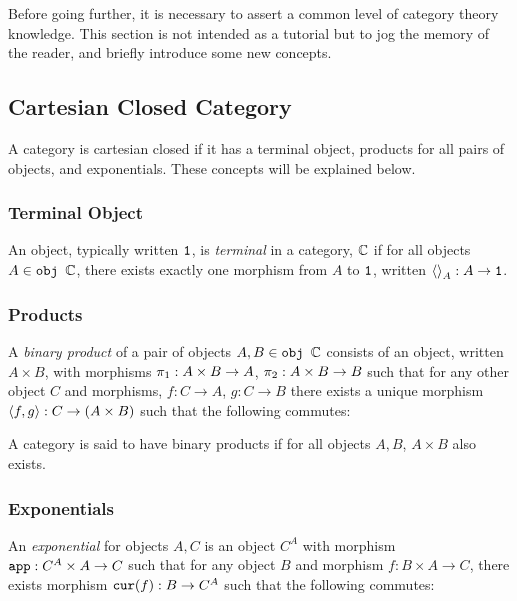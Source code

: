 \documentclass{Report}
\begin{document}



Before going further, it is necessary to assert a common level of category theory knowledge. This section is not intended as a tutorial but to jog the memory of the reader, and briefly introduce some new concepts.

\subsection{Cartesian Closed Category}\label{CCC}
A category is cartesian closed if it has a terminal object, products for all pairs of objects, and exponentials. These concepts will be explained below.

\subsubsection{Terminal Object}
An object, typically written $\texttt{1}$, is \textit{terminal} in a category, $\mathbb{C}$ if for all objects $A\in\texttt{obj }\mathbb{C}$, there exists exactly one morphism from $A$ to $\texttt{1}$, written $\left\langle\right\rangle_{A}: A \rightarrow \texttt{1}$.

\subsubsection{Products}
A \textit{binary product} of a pair of objects $A, B\in\texttt{obj }\mathbb{C}$ consists of an object, written $A \times B$, with morphisms $\pi_1: A\times B\rightarrow A$, $\pi_2: A\times B \rightarrow B$ such that for any other object $C$ and morphisms, $f: C\rightarrow A$, $g: C\rightarrow B$ there exists a unique morphism $\left\langle f, g\right\rangle: C \rightarrow (A\times B)$ such that the following commutes:


A category is said to have binary products if for all objects $A, B$, $A\times B$ also exists.

\subsubsection{Exponentials}
An \textit{exponential} for objects $A, C$ is an object $C^A$ with morphism $\texttt{app}: C^A\times A \rightarrow C$ such that for any object $B$ and morphism $f: B\times A \rightarrow C$, there exists morphism $\texttt{cur}(f): B \rightarrow C^A$ such that the following commutes:
\end{document}
